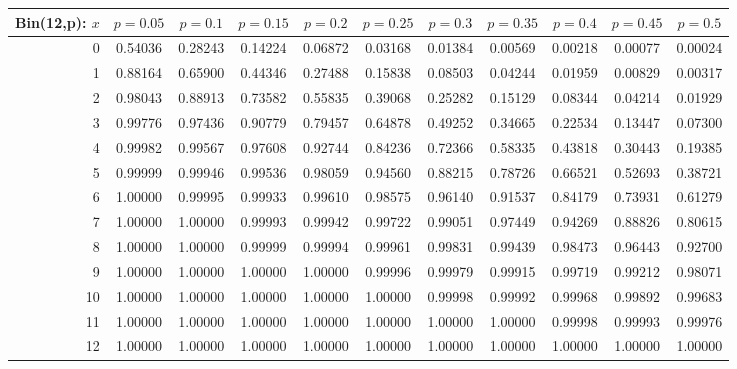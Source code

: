\vspace{8pt minus 6pt}
\begin{tabular}{@{\extracolsep{-2pt}}|r|c|c|c|c|c|c|c|c|c|c|}
\hline
Bin(12,p): $x$
   & $p\!=\!0.05$& $p\!=\!0.1$& $p\!=\!0.15$& $p\!=\!0.2$& $p\!=\!0.25$& $p\!=\!0.3$& $p\!=\!0.35$& $p\!=\!0.4$& $p\!=\!0.45$& $p\!=\!0.5$\\\hline
  0&0.54036&0.28243&0.14224&0.06872&0.03168&0.01384&0.00569&0.00218&0.00077&0.00024\\
  1&0.88164&0.65900&0.44346&0.27488&0.15838&0.08503&0.04244&0.01959&0.00829&0.00317\\
  2&0.98043&0.88913&0.73582&0.55835&0.39068&0.25282&0.15129&0.08344&0.04214&0.01929\\
  3&0.99776&0.97436&0.90779&0.79457&0.64878&0.49252&0.34665&0.22534&0.13447&0.07300\\
  4&0.99982&0.99567&0.97608&0.92744&0.84236&0.72366&0.58335&0.43818&0.30443&0.19385\\
  5&0.99999&0.99946&0.99536&0.98059&0.94560&0.88215&0.78726&0.66521&0.52693&0.38721\\
  6&1.00000&0.99995&0.99933&0.99610&0.98575&0.96140&0.91537&0.84179&0.73931&0.61279\\
  7&1.00000&1.00000&0.99993&0.99942&0.99722&0.99051&0.97449&0.94269&0.88826&0.80615\\
  8&1.00000&1.00000&0.99999&0.99994&0.99961&0.99831&0.99439&0.98473&0.96443&0.92700\\
  9&1.00000&1.00000&1.00000&1.00000&0.99996&0.99979&0.99915&0.99719&0.99212&0.98071\\
 10&1.00000&1.00000&1.00000&1.00000&1.00000&0.99998&0.99992&0.99968&0.99892&0.99683\\
 11&1.00000&1.00000&1.00000&1.00000&1.00000&1.00000&1.00000&0.99998&0.99993&0.99976\\
 12&1.00000&1.00000&1.00000&1.00000&1.00000&1.00000&1.00000&1.00000&1.00000&1.00000\\
\hline
\end{tabular}

